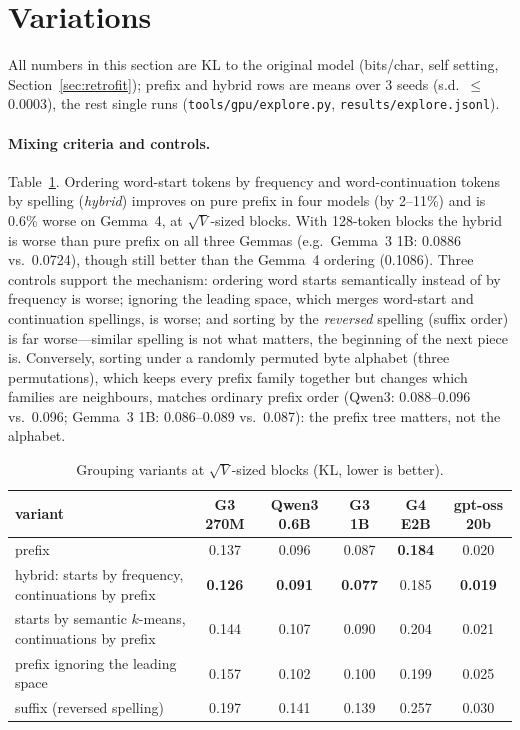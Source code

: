 \documentclass[11pt]{article}
\begin{document}
\section{Variations}\label{sec:variations}

All numbers in this section are KL to the original model (bits/char, self setting, Section~\ref{sec:retrofit}); prefix and hybrid rows are means over 3 seeds (s.d.\ $\le$0.0003), the rest single runs (\texttt{tools/gpu/explore.py}, \texttt{results/explore.jsonl}).

\paragraph{Mixing criteria and controls.} Table~\ref{tab:variants}. Ordering word-start tokens by frequency and word-continuation tokens by spelling (\emph{hybrid}) improves on pure prefix in four models (by 2--11\%) and is 0.6\% worse on Gemma~4, at $\sqrt V$-sized blocks. With 128-token blocks the hybrid is worse than pure prefix on all three Gemmas (e.g.\ Gemma~3 1B: 0.0886 vs.\ 0.0724), though still better than the Gemma~4 ordering (0.1086). Three controls support the mechanism: ordering word starts semantically instead of by frequency is worse; ignoring the leading space, which merges word-start and continuation spellings, is worse; and sorting by the \emph{reversed} spelling (suffix order) is far worse---similar spelling is not what matters, the beginning of the next piece is. Conversely, sorting under a randomly permuted byte alphabet (three permutations), which keeps every prefix family together but changes which families are neighbours, matches ordinary prefix order (Qwen3: 0.088--0.096 vs.\ 0.096; Gemma~3 1B: 0.086--0.089 vs.\ 0.087): the prefix tree matters, not the alphabet.

\begin{table}[t]
\centering
\caption{Grouping variants at $\sqrt V$-sized blocks (KL, lower is better).}
\label{tab:variants}
\footnotesize
\setlength{\tabcolsep}{5pt}
\begin{tabular}{lccccc}
\toprule
variant & G3 270M & Qwen3 0.6B & G3 1B & G4 E2B & gpt-oss 20b \\
\midrule
prefix & 0.137 & 0.096 & 0.087 & \textbf{0.184} & 0.020 \\
hybrid: starts by frequency, continuations by prefix & \textbf{0.126} & \textbf{0.091} & \textbf{0.077} & 0.185 & \textbf{0.019} \\
starts by semantic $k$-means, continuations by prefix & 0.144 & 0.107 & 0.090 & 0.204 & 0.021 \\
prefix ignoring the leading space & 0.157 & 0.102 & 0.100 & 0.199 & 0.025 \\
suffix (reversed spelling) & 0.197 & 0.141 & 0.139 & 0.257 & 0.030 \\
\bottomrule
\end{tabular}
\end{table}
\end{document}
